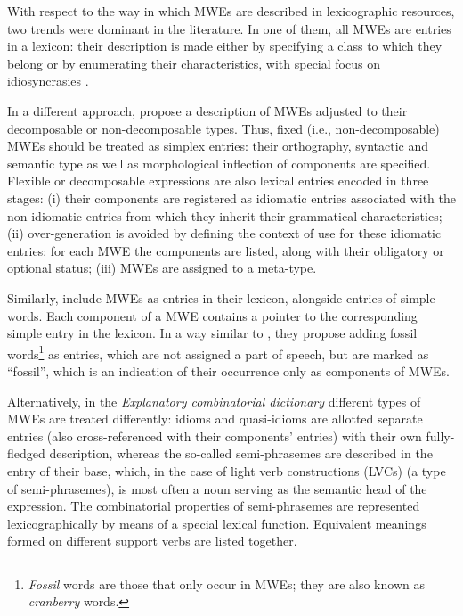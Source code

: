 \documentclass[output=paper,colorlinks,citecolor=brown]{langscibook}
\begin{document}
With respect to the way in which MWEs are described in lexicographic resources, two trends were dominant in the literature. In one of them, all MWEs are entries in a lexicon: their description is made either by specifying a class to which they belong \citep{gregoire-2007} or by enumerating their characteristics, with special focus on idiosyncrasies \citep{gross-1996,shudo_etal_2011,al-hajetal2013,markantonatou-etal-2019-idion,markantonatou-etal-in-prep}. 

In a different approach, \citet{villavicencio-LexicalEncoding} propose a description of MWEs adjusted to their decomposable or non-decomposable types. Thus, fixed (i.e., non-decomposable) MWEs should be treated as simplex entries: their orthography, syntactic and semantic type as well as morphological inflection of components are specified. Flexible or decomposable expressions are also lexical entries encoded in three stages: (i) their components are registered as idiomatic entries associated with  the non-idiomatic entries from which they inherit their grammatical characteristics; (ii) over-generation is avoided by defining the context of use for these idiomatic entries: for each MWE the components are listed, along with their obligatory or optional status; (iii) MWEs are assigned to a meta-type.\largerpage 
    
Similarly, \citet{al-hajetal2013} include MWEs as entries in their lexicon, alongside entries of simple words. Each component of a MWE contains a pointer to the corresponding simple entry in the lexicon. In a way similar to \citet{villavicencio-LexicalEncoding}, they propose adding fossil words\footnote{\textit{Fossil} words are those that only occur in MWEs; they are also known as \textit{cranberry} words.} as entries, which are not assigned a part of speech, but are marked as ``fossil'', which is an indication of their occurrence only as components of MWEs. %

Alternatively, in the \textit{Explanatory combinatorial dictionary} \citep{ECD} different types of MWEs are treated differently: idioms and quasi-idioms %
are allotted separate entries (also cross-referenced with their components' entries) with their own fully-fledged description, whereas the so-called semi-phrasemes %
are described in the entry of their base, which, in the case of light verb constructions (LVCs) (a type of semi-phrasemes), is most often a noun serving as the semantic head of the expression. The combinatorial properties of semi-phrasemes are represented lexicographically by means of a special lexical function. %
Equivalent meanings formed on different support verbs are listed together.%
\end{document}
